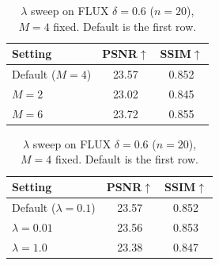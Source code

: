 \documentclass{article} %
\begin{document}
\begin{table}[t]
  \centering
  \begin{minipage}{0.47\linewidth}
    \centering
    \caption{$M$ sweep on FLUX $\delta{=}0.6$ ($n{=}20$), $\lambda{=}0.1$
    fixed. Default is the first row.}
    \label{tab:abl-M}
    \vspace{0.1cm}
    {\scriptsize\setlength{\tabcolsep}{5pt}
    \begin{tabular}{lcc}
      \toprule
      Setting & PSNR$\uparrow$ & SSIM$\uparrow$ \\
      \midrule
      Default ($M{=}4$) & 23.57 & 0.852 \\
      $M{=}2$ & 23.02 & 0.845 \\
      $M{=}6$ & 23.72 & 0.855 \\
      \bottomrule
    \end{tabular}}
  \end{minipage}\hfill
  \begin{minipage}{0.47\linewidth}
    \centering
    \caption{$\lambda$ sweep on FLUX $\delta{=}0.6$ ($n{=}20$), $M{=}4$
    fixed. Default is the first row.}
    \label{tab:abl-lambda}
    \vspace{0.05cm}
    {\scriptsize\setlength{\tabcolsep}{5pt}
    \begin{tabular}{lcc}
      \toprule
      Setting & PSNR$\uparrow$ & SSIM$\uparrow$ \\
      \midrule
      Default ($\lambda{=}0.1$) & 23.57 & 0.852 \\
      $\lambda{=}0.01$ & 23.56 & 0.853 \\
      $\lambda{=}1.0$ & 23.38 & 0.847 \\
      \bottomrule
    \end{tabular}}
  \end{minipage}
\end{table}
\end{document}
